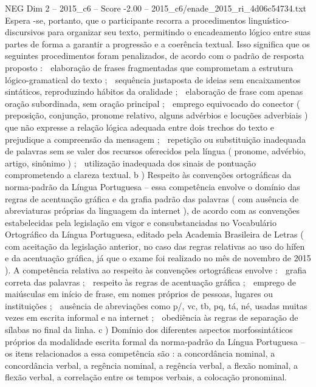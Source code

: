 \begin{textsample}{NEG Dim 2 – 2015\_c6 – Score -2.00 – 2015\_c6/enade\_2015\_ri\_4d06c54734.txt}
Espera -se, portanto, que o participante recorra a procedimentos linguístico-discursivos para organizar seu texto, permitindo o encadeamento lógico entre suas partes de forma a garantir a progressão e a coerência textual.
Isso significa que os seguintes procedimentos foram penalizados, de acordo com o padrão de resposta proposto :  elaboração de frases fragmentadas que comprometam a estrutura lógico-gramatical do texto ;  sequência justaposta de ideias sem encaixamentos sintáticos, reproduzindo hábitos da oralidade ;  elaboração de frase com apenas oração subordinada, sem oração principal ;  emprego equivocado do conector ( preposição, conjunção, pronome relativo, alguns advérbios e locuções adverbiais ) que não expresse a relação lógica adequada entre dois trechos do texto e prejudique a compreensão da mensagem ;  repetição ou substituição inadequada de palavras sem se valer dos recursos oferecidos pela língua ( pronome, advérbio, artigo, sinônimo ) ;  utilização inadequada dos sinais de pontuação comprometendo a clareza textual. b ) Respeito às convenções ortográficas da norma-padrão da Língua Portuguesa – essa competência envolve o domínio das regras de acentuação gráfica e da grafia padrão das palavras ( com ausência de abreviaturas próprias da linguagem da internet ), de acordo com as convenções estabelecidas pela legislação em vigor e consubstanciadas no Vocabulário Ortográfico da Língua Portuguesa, editado pela Academia Brasileira de Letras ( com aceitação da legislação anterior, no caso das regras relativas ao uso do hífen e da acentuação gráfica, já que o exame foi realizado no mês de novembro de 2015 ).
A competência relativa ao respeito às convenções ortográficas envolve :  grafia correta das palavras ;  respeito às regras de acentuação gráfica ;  emprego de maiúsculas em início de frase, em nomes próprios de pessoas, lugares ou instituições ;  ausência de abreviações como p/, vc, tb, pq, tá, né, usadas muitas vezes em escrita informal e na internet ;  obediência às regras de separação de sílabas no final da linha. c ) Domínio dos diferentes aspectos morfossintáticos próprios da modalidade escrita formal da norma-padrão da Língua Portuguesa – os itens relacionados a essa competência são : a concordância nominal, a concordância verbal, a regência nominal, a regência verbal, a flexão nominal, a flexão verbal, a correlação entre os tempos verbais, a colocação pronominal.

\end{textsample}
